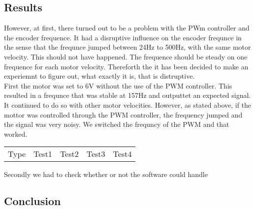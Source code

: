 \documentclass[../main]{subfiles}
\begin{document}
\subsection*{Results}

However, at first, there turned out to be a problem with the PWm controller and the encoder frequence. It had a disruptive influence on the encoder frequnce in the sense that the frequnce jumped between 24Hz to 500Hz, with the same motor velocity. This should not have happened. The frequence should be steady on one frequence for each motor velocity. Thereforth the it has been decided to make an experiemnt to figure out, what exactly it is, that is distruptive. \\
First the motor was set to 6V without the use of the PWM controller. This resulted in a frequnce that was stable at 157Hz and outputtet an expected signal. It continued to do so with other motor velocities. However, as stated above, if the mottor was controlled through the PWM controller, the frequency jumped and the signal was very noisy. We switched the frequncy of the PWM and that worked. \\


\begin{center}
\begin{tabular}{ c c c c c}
 Type & Test1 & Test2 & Test3 & Test4 \\

\end{tabular}
\end{center}

Secondly we had to check whether or not the software could handle


\subsection*{Conclusion}
\end{document}
